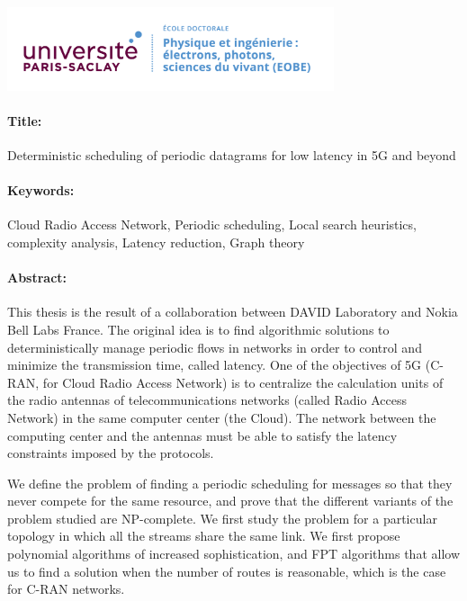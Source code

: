 \noindent 
\includegraphics[height=2.45cm]{EOBE}
\vspace{1cm}
\begin{mdframed}[linecolor=Prune,linewidth=1]
\vspace{-.25cm}
\paragraph*{Title:} Deterministic scheduling of periodic datagrams for low latency in 5G and beyond 

\begin{small}
\vspace{-.25cm}
\paragraph*{Keywords:}  Cloud Radio Access Network, Periodic scheduling, Local search heuristics, complexity analysis, Latency reduction,  Graph theory
\vspace{-.5cm}
\begin{multicols}{2}
\paragraph*{Abstract:} This thesis is the result of a collaboration between DAVID Laboratory and Nokia Bell Labs France.
The original idea is to find algorithmic solutions to deterministically manage periodic flows in networks in order to control and minimize the transmission time, called latency. One of the objectives of 5G (C-RAN, for Cloud Radio Access Network) is to centralize the calculation units of the radio antennas of telecommunications networks (called Radio Access Network) in the same computer center (the Cloud). The network between the computing center and the antennas must be able to satisfy the latency constraints imposed by the protocols.

We define the problem of finding a periodic scheduling for messages so that they never compete for the same resource, and prove that the different variants of the problem studied are NP-complete. We first study the problem for a particular topology in which all the streams share the same link. We first propose polynomial algorithms of increased sophistication, and FPT algorithms that allow us to find a solution when the number of routes is reasonable, which is the case for C-RAN networks.


\end{multicols}
\end{small}
\end{mdframed}
